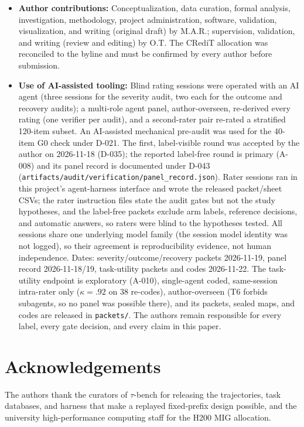 \documentclass[a4paper,fleqn]{cas-sc}
\begin{document}
\begin{itemize}
  panel, author-overseen; no human annotation was used and direct identifiers are scrubbed
  before freeze. The institutional ethics determination for the annotation procedure is pending
  and will be cited here once issued (tracked in \texttt{docs/submission/checklist.md}).
  \item \textbf{Author contributions:} Conceptualization, data curation, formal analysis,
  investigation, methodology, project administration, software, validation, visualization, and
  writing (original draft) by M.A.R.; supervision, validation, and writing (review and editing)
  by O.T. The
  CRediT allocation was reconciled to the byline and must be confirmed by every
  author before submission.
  \item \textbf{Use of AI-assisted tooling:} Blind rating sessions were operated with an AI agent
  (three sessions for the severity audit, two each for the outcome and recovery audits); a multi-role
  agent panel, author-overseen, re-derived every rating (one verifier per audit), and a second-rater pair
  re-rated a stratified 120-item subset. An AI-assisted mechanical pre-audit was used for the
  40-item G0 check under D-021. The first, label-visible round was accepted by the author on
  2026-11-18 (D-035); the reported label-free round is primary (A-008) and its panel record is
  documented under D-043 (\texttt{artifacts/audit/verification/panel\_record.json}). Rater sessions ran in this
  project's agent-harness interface and wrote the released packet/sheet CSVs; the rater
  instruction files state the audit gates but not the study hypotheses, and the label-free packets
  exclude arm labels, reference decisions, and automatic answers, so raters were blind to the
  hypotheses tested. All sessions share one underlying model family (the session model identity was
  not logged), so their agreement is reproducibility evidence, not human
  independence. Dates: severity/outcome/recovery packets 2026-11-19, panel record 2026-11-18/19,
  task-utility packets and codes 2026-11-22. The task-utility endpoint is exploratory (A-010),
  single-agent coded, same-session intra-rater only ($\kappa=.92$ on 38 re-codes), author-overseen (T6 forbids
  subagents, so no panel was possible there), and its packets, sealed maps, and codes are released
  in \texttt{packets/}. The authors remain responsible for every label, every gate decision, and every
  claim in this paper.
\end{itemize} \section*{Acknowledgements}
The authors thank the curators of $\tau$-bench for releasing the trajectories, task databases, and
harness that make a replayed fixed-prefix design possible, and the university high-performance
computing staff for the H200 MIG allocation. 
\sloppy
\setlength{\bibsep}{0pt}
\renewcommand{\bibfont}{\fontsize{8.5pt}{9pt}\selectfont}

 \vspace{4pt}
\end{document}

